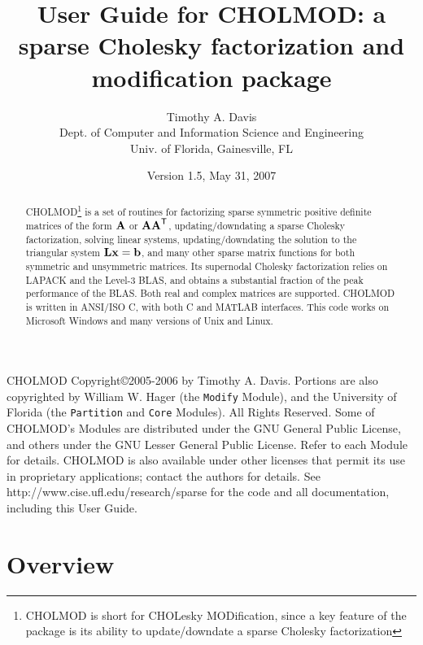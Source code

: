 \documentclass[11pt]{article}
\newcommand{\m}[1]{{\bf{#1}}}       %
\newcommand{\tr}{^{\sf T}}          %
\begin{document}
\author{Timothy A. Davis \\
Dept. of Computer and Information Science and Engineering \\
Univ. of Florida, Gainesville, FL}
\title{User Guide for CHOLMOD: a sparse Cholesky factorization and
modification package}
\date{Version 1.5, May 31, 2007}
\maketitle

\begin{abstract}
    CHOLMOD\footnote{CHOLMOD is short for CHOLesky MODification,
    since a key feature of the package is its ability to update/downdate
    a sparse Cholesky factorization}
    is a set of routines for factorizing sparse symmetric positive
    definite matrices of the form $\m{A}$ or $\m{AA}\tr$, updating/downdating
    a sparse Cholesky factorization, solving linear systems, updating/downdating
    the solution to the triangular system $\m{Lx}=\m{b}$, and many other sparse
    matrix functions for both symmetric and unsymmetric matrices.
    Its supernodal Cholesky factorization
    relies on LAPACK and the Level-3 BLAS, and obtains a substantial fraction
    of the peak performance of the BLAS.  Both real and complex matrices
    are supported.  CHOLMOD is written in ANSI/ISO C, with both
    C and MATLAB interfaces.  This code works on Microsoft Windows and many versions
    of Unix and Linux.
\end{abstract}

CHOLMOD Copyright\copyright 2005-2006 by Timothy A. Davis.  Portions are also
copyrighted by William W. Hager (the {\tt Modify} Module),
and the University of Florida (the {\tt Partition} and {\tt Core} Modules).
All Rights Reserved.  Some of CHOLMOD's Modules are distributed under the GNU
General Public License, and others under the GNU Lesser General Public License.
Refer to each Module for details.
CHOLMOD is also available under other licenses that permit its use in
proprietary applications; contact the authors for details.
See http://www.cise.ufl.edu/research/sparse for the code and all documentation,
including this User Guide.

\newpage
\tableofcontents

\newpage \section{Overview}
\end{document}
